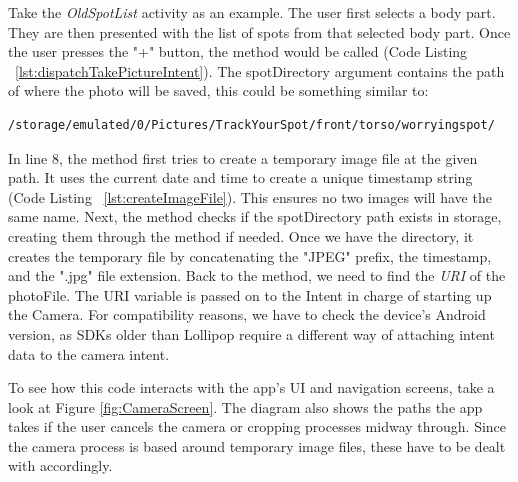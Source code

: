 Take the \emph{OldSpotList} activity as an example. The user first selects a body part. They are then presented with the list of spots from that selected body part. Once the user presses the "+" button, the  method would be called (Code Listing ~\ref{lst:dispatchTakePictureIntent}). The spotDirectory argument contains the path of where the photo will be saved, this could be something similar to:
\begin{verbatim}
/storage/emulated/0/Pictures/TrackYourSpot/front/torso/worryingspot/
\end{verbatim}
In line 8, the  method first tries to create a temporary image file at the given path. It uses the current date and time to create a unique timestamp string (Code Listing ~\ref{lst:createImageFile}). This ensures no two images will have the same name. Next, the method checks if the spotDirectory path exists in storage, creating them through the  method if needed. Once we have the directory, it creates the temporary file by concatenating the "JPEG\textunderscore" prefix, the timestamp, and the ".jpg" file extension. Back to the  method, we need to find the \emph{URI} of the photoFile. The URI variable is passed on to the Intent in charge of starting up the Camera. For compatibility reasons, we have to check the device's Android version, as SDKs older than Lollipop require a different way of attaching intent data to the camera intent.

To see how this code interacts with the app's UI and navigation screens, take a look at Figure \ref{fig:CameraScreen}. The diagram also shows the paths the app takes if the user cancels the camera or cropping processes midway through. Since the camera process is based around temporary image files, these have to be dealt with accordingly.

\clearpage

